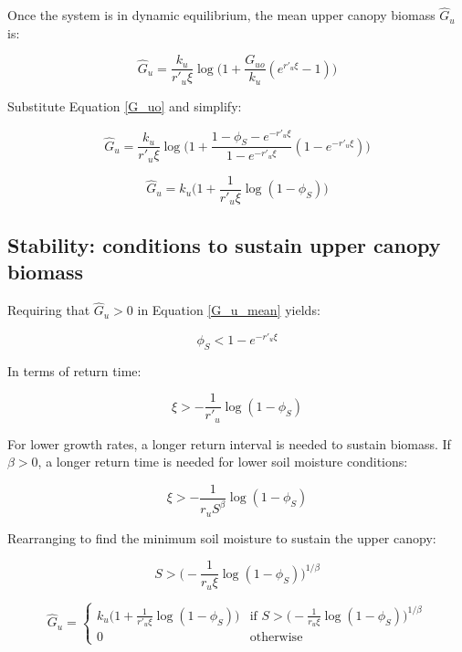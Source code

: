 \documentclass[12pt]{article}
\begin{document}
Once the system is in dynamic equilibrium, the mean upper canopy biomass $\hat G_u$ is:

\begin{equation}
\hat{G}_u =
 		 \frac{k_u}{r'_u \xi}\log \bigg(1 + \frac{G_{uo}}{k_u}( e^{r'_u \xi}-1)\bigg)
\end{equation}

Substitute Equation  \ref{G_uo} and simplify:

\begin{equation}
\hat{G}_u =
 \frac{k_u}{r'_u \xi}\log \big(1 +   \frac{1- \phi_S - e^{-r'_u \xi} }{1 - e^{-r'_u \xi}} ( 1 - e^{-r'_u \xi})\big)
\end{equation}

    
\begin{equation}
\hat{G}_u =
  k_u \big( 1 + \frac{1}{r'_u \xi} \log(1-\phi_S) \big)
		\label{G_u_mean}
\end{equation}


\subsection*{Stability: conditions to sustain upper canopy biomass}

Requiring that $\hat{G}_u >0$ in Equation \ref{G_u_mean} yields:

\begin{equation}
\phi_S < 1- e^{-r'_u \xi}
\end{equation}

In terms of return time:

\begin{equation}
\xi > - \frac{1}{r'_u}\log (1 - \phi_S) 
\end{equation}

For lower growth rates, a longer return interval is needed to sustain biomass.
If $\beta>0$, a longer return time is needed for lower soil moisture conditions:

\begin{equation}
\xi > - \frac{1}{r_u S^\beta}\log (1 - \phi_S)
\end{equation}

Rearranging to find the minimum soil moisture to sustain the upper canopy:
 
\begin{equation}
S > \bigg( - \frac{1}{r_u \xi }\log (1 - \phi_S)\bigg)^{1/\beta}
\end{equation}

\begin{equation}
\hat{G}_u  =
    \begin{cases}
       k_u \big( 1 + \frac{1}{r'_u \xi} \log(1-\phi_S) \big)
	  & \text{if  } S > \big( - \frac{1}{r_u \xi }\log (1 - \phi_S)\big)^{1/\beta}
		\\[10pt]
      0 & \text{otherwise}
    \end{cases}       
\end{equation}
\end{document}
